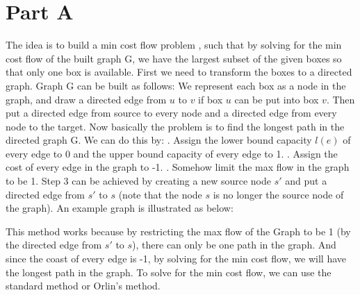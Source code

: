 \documentclass[11pt]{article}
\begin{document}

\section{Part A}
\noindent  The idea is to build a min cost flow problem , such that by solving for the min cost flow of the built graph G, we have the largest subset of the given boxes so that only one box is available. \newline
\noindent First we need to transform the boxes to a directed graph.  Graph G can be built as follows: We represent each box as a node in the graph, and draw a directed edge from $u$ to $v$ if box $u$ can be put into box $v$.  Then put a directed edge from source to every node and a directed edge from every node to the target.  Now basically the problem is to find the longest path in the directed graph G. We can do this by: \newline
{}. Assign the lower bound capacity $l(e)$ of every edge to 0 and the upper bound capacity of every edge to 1. \newline
{}. Assign the cost of every edge in the graph to -1. \newline
{}. Somehow limit the max flow in the graph to be 1. \newline
\noindent Step 3 can be achieved by creating a new source node $s'$ and put a directed edge from $s'$ to $s$ (note that the node $s$ is no longer the source node of the graph). An example graph is illustrated as below:\newline

\vspace{50mm}

\noindent This method works because by restricting the max flow of the Graph to be 1 (by the directed edge from $s'$ to $s$), there can only be one path in the graph. And since the coast of every edge is -1, by solving for the min cost flow, we will have the longest path in the graph. To solve for the min cost flow, we can use the standard method or Orlin's method. 
\end{document}

